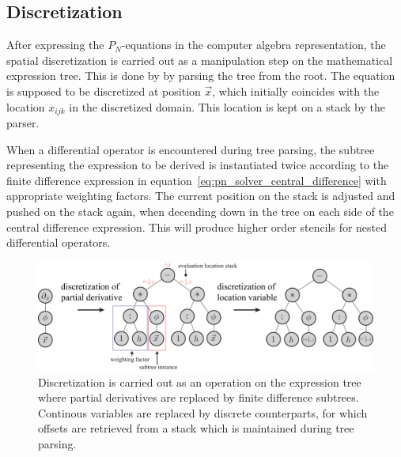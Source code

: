 \subsection{Discretization}
\label{sec:pn_stencil_gen}

After expressing the $P_N$-equations in the computer algebra representation, the spatial discretization is carried out as a manipulation step on the mathematical expression tree. This is done by by parsing the tree from the root. The equation is supposed to be discretized at position $\vec{x}$, which initially coincides with the location $x_{ijk}$ in the discretized domain. This location is kept on a stack by the parser.

When a differential operator is encountered during tree parsing, the subtree representing the expression to be derived is instantiated twice according to the finite difference expression in equation~\ref{eq:pn_solver_central_difference} with appropriate weighting factors. The current position on the stack is adjusted and pushed on the stack again, when decending down in the tree on each side of the central difference expression. This will produce higher order stencils for nested differential operators.
\begin{figure}[h]
\centering
\includegraphics[width=1.0\textwidth]{04_pn_method/figures/fig_car_discretization.pdf}
\caption{Discretization is carried out as an operation on the expression tree where partial derivatives are replaced by finite difference subtrees. Continous variables are replaced by discrete counterparts, for which offsets are retrieved from a stack which is maintained during tree parsing.}
\label{fig:pn_discretization_differential}
\end{figure}


